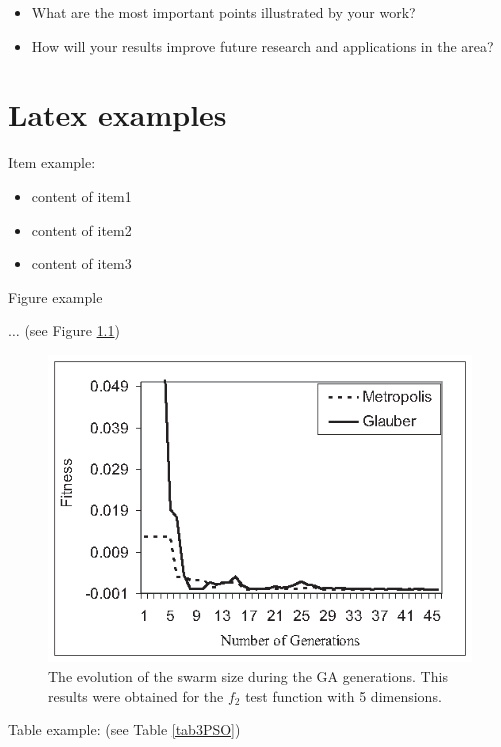 \documentclass[runningheads,a4paper,11pt]{report}
\begin{document}
\begin{itemize}
	\item What are the most important points illustrated by your work? 
	\item How will your results improve future research and applications in the area? 
\end{itemize}


\chapter{Latex examples}

Item example: 

\begin{itemize}
	\item content of item1
 	\item content of item2
 	\item content of item3
\end{itemize}



Figure example 

$\ldots$ (see Figure \ref{swarmsize})

\begin{figure}[htbp]
	\centerline{\includegraphics{Fig/FitEvol.eps}}  
	\caption{The evolution of the swarm size during the GA generations. This results were obtained for the $f_2$ test function with 5 dimensions.}
	\label{swarmsize}
\end{figure}


Table example: (see Table \ref{tab3PSO})
\end{document}
